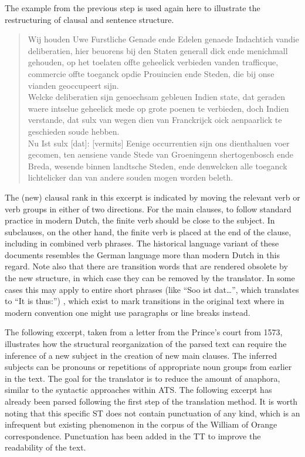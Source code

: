 \begin{paper}
The example from the previous step is used again here to illustrate the
restructuring of clausal and sentence structure.

\begin{quote}
Wij houden Uwe Furstliche Genade ende Edelen genaede Indachtich vandie
deliberatien, hier beuorens bij den Staten generall dick ende menichmall
gehouden, op het toelaten offte geheelick verbieden vanden trafficque,
commercie offte toeganck opdie Prouincien ende Steden, die bij onse
vianden geoccupeert {sijn}.\\
Welcke deliberatien {sijn} genoechsam {gebleuen} Indien state, dat
geraden waere intselue geheelick mede op grote poenen te verbieden, doch
Indien verstande, dat sulx van wegen dien van Franckrijck oick
aenpaarlick {te geschieden} soude hebben.\\
Nu Ist sulx {[}dat{]}: {[}vermits{]} Eenige occurrentien {sijn} ons
dienthaluen voer gecomen, ten aensiene vande Stede van Groeningenn
shertogenbosch ende Breda, wesende binnen landtsche Steden, ende
denwelcken alle toeganck lichtelicker dan van andere souden mogen
{worden} beleth.
\end{quote}

\noindent The (new) clausal rank in this excerpt is indicated by moving the
relevant verb or verb groups in either of two directions. For the main
clauses, to follow standard practice in modern Dutch, the finite verb
should be close to the subject. In subclauses, on the other hand, the
finite verb is placed at the end of the clause, including in combined
verb phrases. The historical language variant of these documents
resembles the German language more than modern Dutch in this regard.
Note also that there are transition words that are rendered obsolete by
the new structure, in which case they can be removed by the translator.
In some cases this may apply to entire short phrases (like ``Soo ist
dat\ldots{}'', which translates to ``It is thus:'') , which exist to mark
transitions in the original text where in modern convention one might
use paragraphs or line breaks instead.

The following excerpt, taken from a letter from the Prince's court from
1573, illustrates how the structural reorganization of the parsed text
can require the inference of a new subject in the creation of new main
clauses. The inferred subjects can be pronouns or repetitions of
appropriate noun groups from earlier in the text. The goal for the
translator is to reduce the amount of anaphora, similar to the syntactic
approaches within ATS. The following excerpt has already been parsed
following the first step of the translation method. It is worth noting
that this specific ST does not contain punctuation of any kind, which is
an infrequent but existing phenomenon in the corpus of the William of
Orange correspondence. Punctuation has been added in the TT to improve
the readability of the text.


\end{paper}
